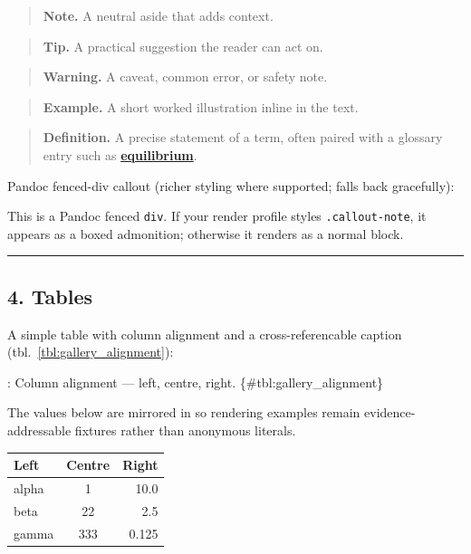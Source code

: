 \documentclass[
]{article}
\newcounter{none} %
\theoremstyle{plain}
\theoremstyle{definition}
\begin{document}
\begin{quote}
\textbf{Note.} A neutral aside that adds context.
\end{quote}

\begin{quote}
\textbf{Tip.} A practical suggestion the reader can act on.
\end{quote}

\begin{quote}
\textbf{Warning.} A caveat, common error, or safety note.
\end{quote}

\begin{quote}
\textbf{Example.} A short worked illustration inline in the text.
\end{quote}

\begin{quote}
\textbf{Definition.} A precise statement of a term, often paired with a
glossary entry such as \hyperref[gl:equilibrium]{\textbf{equilibrium}}.
\end{quote}

Pandoc fenced-div callout (richer styling where supported; falls back
gracefully):

This is a Pandoc fenced \texttt{div}. If your render profile styles
\texttt{.callout-note}, it appears as a boxed admonition; otherwise it
renders as a normal block.

\begin{center}\rule{0.5\linewidth}{0.5pt}\end{center}

\subsection{4. Tables}\label{tables}

A simple table with column alignment and a cross-referencable caption
(tbl.~\ref{tbl:gallery_alignment}):

: Column alignment --- left, centre, right. \{\#tbl:gallery\_alignment\}

The values below are mirrored in
 so rendering
examples remain evidence-addressable fixtures rather than anonymous
literals.

{\def\LTcaptype{none} %
\begin{longtable}[]{@{}lcr@{}}
\toprule\noalign{}
Left & Centre & Right \\
\midrule\noalign{}
\endhead
\bottomrule\noalign{}
\endlastfoot
alpha & 1 & 10.0 \\
beta & 22 & 2.5 \\
gamma & 333 & 0.125 \\
\end{longtable}
}
\end{document}
